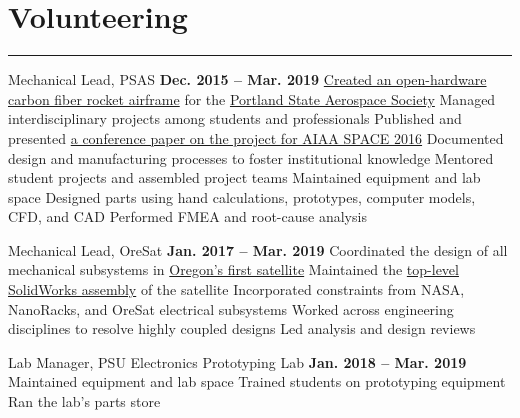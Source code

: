 \section{Volunteering}
\noindent\rule{\textwidth}{\hlinewidth}
	\begin{innerlist}
	\item Mechanical Lead, PSAS
		\hfill\textbf{Dec. 2015 -- Mar. 2019} %
		\subitem \href{https://github.com/psas/sw-cad-airframe-lv3.0}{Created 
			an open-hardware carbon fiber rocket airframe} for the 
			\href{http://psas.pdx.edu/}{Portland State Aerospace Society}
		\subitem Managed interdisciplinary projects among students and professionals
		\subitem Published and presented \href{http://arc.aiaa.org/doi/pdf/10.2514/6.2016-5365}{a conference paper on the project for AIAA SPACE 2016}
		\subitem Documented design and manufacturing processes to foster institutional knowledge
		\subitem Mentored student projects and assembled project teams
		\subitem Maintained equipment and lab space
		\subitem Designed parts using hand calculations, prototypes, computer models, CFD, and CAD
		\subitem Performed FMEA and root-cause analysis
	\item Mechanical Lead, OreSat 
		\hfill\textbf{Jan. 2017 -- Mar. 2019}
		\subitem Coordinated the design of all mechanical subsystems in \href{http://oresat.org/}{Oregon's first satellite}
		\subitem Maintained the \href{https://github.com/oresat/oresat-structure}{top-level SolidWorks assembly} of the satellite
		\subitem Incorporated constraints from NASA, NanoRacks, and OreSat electrical subsystems
		\subitem Worked across engineering disciplines to resolve highly coupled designs
		\subitem Led analysis and design reviews 
	\item Lab Manager, PSU Electronics Prototyping Lab
		\hfill\textbf{Jan. 2018 -- Mar. 2019}
		\subitem Maintained equipment and lab space
		\subitem Trained students on prototyping equipment
		\subitem Ran the lab's parts store
	\end{innerlist}

